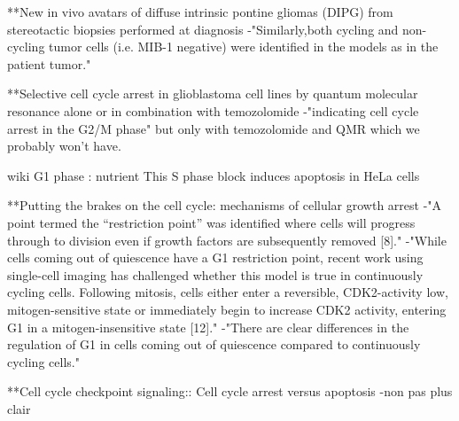 \documentclass[11pt,a4paper]{article}
\begin{document}
**New in vivo avatars of diffuse intrinsic pontine gliomas (DIPG)
from stereotactic biopsies performed at diagnosis
-"Similarly,both cycling and non-cycling tumor cells (i.e. MIB-1
negative) were identified in the models as in the patient
tumor."


**Selective cell cycle arrest in glioblastoma cell lines by quantum molecular resonance alone or in combination with temozolomide
-"indicating cell cycle arrest in the G2/M phase" but only with temozolomide and QMR which we probably won't have.

wiki 
G1 phase : nutrient
This S phase block induces apoptosis in HeLa cells

**Putting the brakes on the cell cycle: mechanisms of cellular growth arrest
-"A point termed the “restriction point” was identified where cells will progress through to division even if growth factors are subsequently removed [8]."
-"While cells coming out of quiescence have a G1 restriction point, recent work using single-cell imaging has challenged whether this model is true in continuously cycling cells. Following mitosis, cells either enter a reversible, CDK2-activity low, mitogen-sensitive state or immediately begin to increase CDK2 activity, entering G1 in a mitogen-insensitive state [12]."
-"There are clear differences in the regulation of G1 in cells coming out of quiescence compared to continuously cycling cells."

**Cell cycle checkpoint signaling:: Cell cycle arrest versus apoptosis
-non pas plus clair
\end{document}
